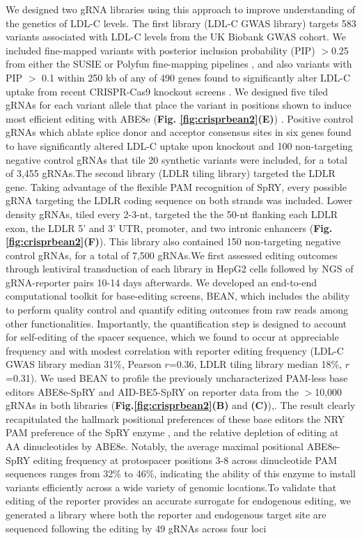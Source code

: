 \documentclass[a4paper, titlepage, openright]{book}
\begin{document}
We designed two gRNA libraries using this approach to improve understanding of the genetics of LDL-C levels. The first library (LDL-C GWAS library) targets 583 variants associated with LDL-C levels from the UK Biobank GWAS cohort. We included fine-mapped variants with posterior inclusion probability (PIP) $>$0.25 from either the SUSIE or Polyfun fine-mapping pipelines \citep{wang2020simple, weissbrod2020functionally}, and also variants with PIP $>$ 0.1 within 250 kb of any of 490 genes found to significantly alter LDL-C uptake from recent CRISPR-Cas9 knockout screens \citep{hamilton2023systematic, emmer2021genome}. We designed five tiled gRNAs for each variant allele that place the variant in positions shown to induce most efficient editing with ABE8e (\textbf{Fig. \ref{fig:crisprbean2}(E)}) \citep{arbab2023base}. Positive control gRNAs which ablate splice donor and acceptor consensus sites in six genes found to have significantly altered LDL-C uptake upon knockout \citep{hamilton2023systematic} and 100 non-targeting negative control gRNAs that tile 20 synthetic variants were included, for a total of 3,455 gRNAs.The second library (LDLR tiling library) targeted the LDLR gene. Taking advantage of the flexible PAM recognition of SpRY, every possible gRNA targeting the LDLR coding sequence on both strands was included. Lower density gRNAs, tiled every 2-3-nt, targeted the the 50-nt flanking each LDLR exon, the LDLR 5’ and 3’ UTR, promoter, and two intronic enhancers (\textbf{Fig. \ref{fig:crisprbean2}(F)}). This library also contained 150 non-targeting negative control gRNAs, for a total of 7,500 gRNAs.We first assessed editing outcomes through lentiviral transduction of each library in HepG2 cells followed by NGS of gRNA-reporter pairs 10-14 days afterwards. We developed an end-to-end computational toolkit for base-editing screens, BEAN, which includes the ability to perform quality control and quantify editing outcomes from raw reads among other functionalities. Importantly, the quantification step is designed to account for self-editing of the spacer sequence, which we found to occur at appreciable frequency and with modest correlation with reporter editing frequency (LDL-C GWAS library median 31\%, Pearson $r$=0.36, LDLR tiling library median 18\%, $r$=0.31). We used BEAN to profile the previously uncharacterized PAM-less base editors ABE8e-SpRY and AID-BE5-SpRY on reporter data from the $>$10,000 gRNAs in both libraries (\textbf{Fig.\ref{fig:crisprbean2}(B)} and \textbf{(C)}),. The result clearly recapitulated the hallmark positional preferences of these base editors \citep{myers1986fine, wang2014genetic} the NRY PAM preference of the SpRY enzyme \citep{komor2016programmable, gaudelli2017programmable}, and the relative depletion of editing at AA dinucleotides by ABE8e. Notably, the average maximal positional ABE8e-SpRY editing frequency at protospacer positions 3-8 across dinucleotide PAM sequences ranges from 32\% to 46\%, indicating the ability of this enzyme to install variants efficiently across a wide variety of genomic locations.To validate that editing of the reporter provides an accurate surrogate for endogenous editing, we generated a library where both the reporter and endogenous target site are sequenced following the editing by 49 gRNAs across four loci 
\end{document}
